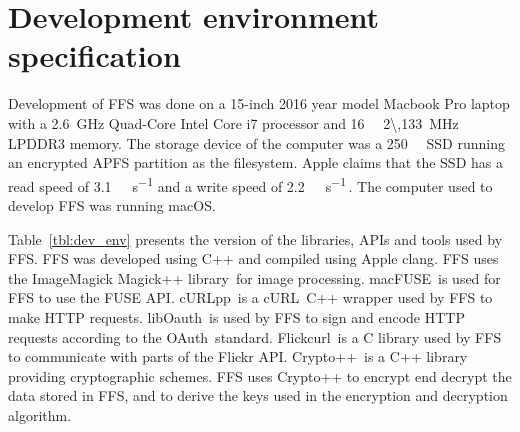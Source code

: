 \section{Development environment specification}
\label{sec:dev_env}
Development of \gls{FFS} was done on a 15-inch 2016 year model Macbook Pro laptop with a \SI{2.6}{\giga\hertz} \mbox{Quad-Core} Intel Core i7 processor and \SI{16}{\giga\byte} \SI{2\,133}{\mega\hertz} LPDDR3 memory. The storage device of the computer was a \SI{250}{\giga\byte} \gls{SSD} running an encrypted \gls{APFS} partition as the filesystem. Apple claims that the \gls{SSD} has a read speed of \SI[per-mode = symbol]{3.1}{\giga\byte\per\second} and a write speed of \SI[per-mode = symbol]{2.2}{\giga\byte\per\second}\,\cite{lovejoyNew15inchMacBook2016}. The computer used to develop FFS was running macOS.

Table~\ref{tbl:dev_env} presents the version of the libraries, \gls{API}s and tools used by FFS. FFS was developed using C++ and compiled using Apple clang. \gls{FFS} uses the ImageMagick Magick++ library\,\cite{ImageMagick2022} for image processing. macFUSE\,\cite{HomeMacFUSE} is used for \gls{FFS} to use the \gls{FUSE} \gls{API}. cURLpp\,\cite{barrette-lapierreCURLpp2022} is a cURL\,\cite{CurlCurl2022} C++ wrapper used by \gls{FFS} to make HTTP requests. libOauth\,\cite{Liboauth} is used by \gls{FFS} to sign and encode HTTP requests according to the OAuth\,\cite{barrette-lapierreCURLpp2022} standard. Flickcurl\,\cite{beckettFlickcurlLibraryFlickr} is a C library used by \gls{FFS} to communicate with parts of the Flickr \gls{API}. Crypto++\,\cite{CryptoLibraryFree} is a C++ library providing cryptographic schemes. \gls{FFS} uses Crypto++ to encrypt end decrypt the data stored in \gls{FFS}, and to derive the keys used in the encryption and decryption algorithm. 


